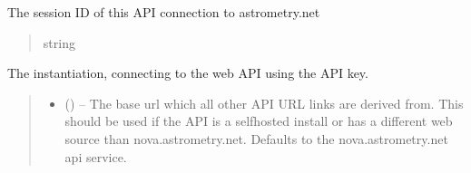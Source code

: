 \documentclass[letterpaper,11pt,english]{sphinxmanual}
\begin{document}
\begin{savenotes}
\begin{fulllineitems}
\begin{savenotes}\begin{fulllineitems}
\label{\detokenize{code/opihiexarata.astrometry.webclient:opihiexarata.astrometry.webclient.AstrometryNetWebAPIEngine.session}}
\pysigstartsignatures
{}
\pysigstopsignatures
\sphinxAtStartPar
The session ID of this API connection to astrometry.net
\begin{quote}\begin{description}
\sphinxAtStartPar
string

\end{description}\end{quote}

\end{fulllineitems}\end{savenotes}


\begin{savenotes}\begin{fulllineitems}
\label{\detokenize{code/opihiexarata.astrometry.webclient:opihiexarata.astrometry.webclient.AstrometryNetWebAPIEngine.__init__}}
\pysigstartsignatures
{}
\pysigstopsignatures
\sphinxAtStartPar
The instantiation, connecting to the web API using the API key.
\begin{quote}\begin{description}
\begin{itemize}
\item {} 
\sphinxAtStartPar
{} (\sphinxstyleliteralemphasis{\sphinxupquote{, }}) – The base url which all other API URL links are derived from. This
should be used if the API is a self\sphinxhyphen{}hosted install or has a
different web source than nova.astrometry.net. Defaults to the
nova.astrometry.net api service.


\end{itemize}
\end{description}
\end{quote}
\end{fulllineitems}
\end{savenotes}
\end{fulllineitems}
\end{savenotes}
\end{document}
